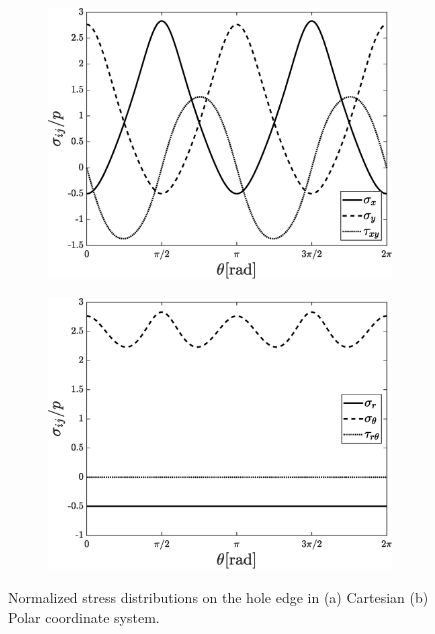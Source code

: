 \documentclass{article}
\begin{document}
\begin{figure}[H]
        \begin{subfigure}{0.5\textwidth}
            \includegraphics[width=1\linewidth, height=0.8\linewidth]{figures/stress_cartesian.eps} 
            \caption{}
            \label{fig:stress_cartesian}
        \end{subfigure}
        \begin{subfigure}{0.5\textwidth}
            \includegraphics[width=1\linewidth, height=0.8\linewidth]{figures/stress_polar.eps} 
            \caption{}
            \label{fig:stress_polar}
        \end{subfigure}
    \caption{Normalized stress distributions on the hole edge in (a) Cartesian (b) Polar coordinate system.}
\end{figure}
\end{document}
